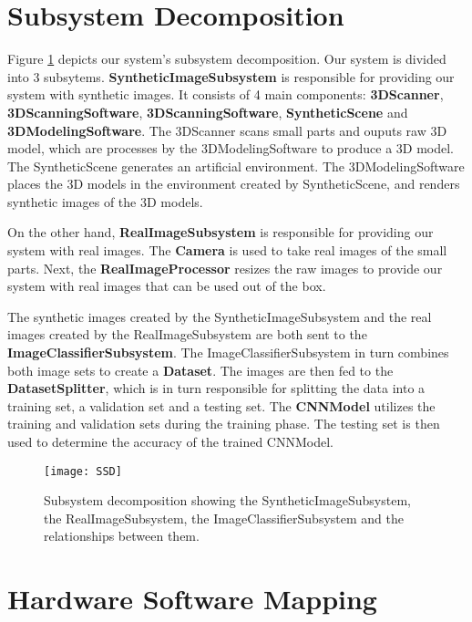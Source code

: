 \section{Subsystem Decomposition}\label{sec:subsystem_decomposition}

Figure \ref{fig:SSD} depicts our system's subsystem decomposition. Our system is divided into 3 subsytems. \textbf{SyntheticImageSubsystem} is responsible for providing our system with synthetic images. It consists of 4 main components: \textbf{3DScanner}, \textbf{3DScanningSoftware}, \textbf{3DScanningSoftware}, \textbf{SyntheticScene} and \textbf{3DModelingSoftware}. The 3DScanner scans small parts and ouputs raw 3D model, which are processes by the 3DModelingSoftware to produce a 3D model. The SyntheticScene generates an artificial environment. The 3DModelingSoftware places the 3D models in the environment created by SyntheticScene, and renders synthetic images of the 3D models.

On the other hand, \textbf{RealImageSubsystem} is responsible for providing our system with real images. The \textbf{Camera} is used to take real images of the small parts. Next, the \textbf{RealImageProcessor} resizes the raw images to provide our system with real images that can be used out of the box.

The synthetic images created by the SyntheticImageSubsystem and the real images created by the RealImageSubsystem are both sent to the \textbf{ImageClassifierSubsystem}. The ImageClassifierSubsystem in turn combines both image sets to create a \textbf{Dataset}. The images are then fed to the \textbf{DatasetSplitter}, which is in turn responsible for splitting the data into a training set, a validation set and a testing set. The \textbf{CNNModel} utilizes the training and validation sets during the training phase. The testing set is then used to determine the accuracy of the trained CNNModel.

\begin{figure}[H]
\centering
  \texttt{[image: SSD]}
\caption{Subsystem decomposition showing the SyntheticImageSubsystem, the RealImageSubsystem, the ImageClassifierSubsystem and the relationships between them.}
\label{fig:SSD}
\end{figure}


\section{Hardware Software Mapping}\label{sec:hardware_software_mapping}

